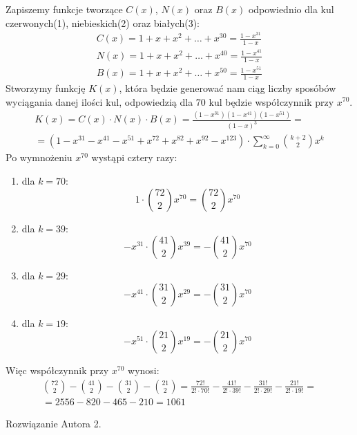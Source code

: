 \documentclass{mwart}
\begin{document}
\begin{mdframed}
    Zapiszemy funkcje tworzące $C(x)$, $N(x)$ oraz $B(x)$ odpowiednio dla kul czerwonych(1), niebieskich(2) oraz białych(3):
    \begin{align}
    C(x) = 1 + x + x^2 + \dots + x^{30} = \frac{1 - x^{31}}{1 - x} \\
    N(x) = 1 + x + x^2 + \dots + x^{40} = \frac{1 - x^{41}}{1 - x} \\
    B(x) = 1 + x + x^2 + \dots + x^{50} = \frac{1 - x^{51}}{1 - x}
    \end{align}
    Stworzymy funkcję $K(x)$, która będzie generować nam ciąg liczby sposóbów wyciągania danej ilości kul, odpowiedzią dla 70 kul będzie współczynnik przy $x^{70}$.
    \begin{gather*}
    K(x) = C(x) \cdot N(x) \cdot B(x) = \frac{(1 - x^{31})(1 - x^{41})(1 - x^{51})}{(1 - x)^3} = \\
    = (1 - x^{31} - x^{41} - x^{51} + x^{72} + x^{82} + x^{92} - x^{123}) \cdot \sum_{k=0}^{\infty} \binom{k+2}{2}x^k
    \end{gather*}
    Po wymnożeniu $x^{70}$ wystąpi cztery razy:
    \begin{enumerate}
        \item dla $k = 70$: \[ 1 \cdot \binom{72}{2}x^{70} = \binom{72}{2}x^{70}\]
        \item dla $k = 39$: \[ -x^{31} \cdot \binom{41}{2}x^{39} = -\binom{41}{2}x^{70}\]
        \item dla $k = 29$: \[ -x^{41} \cdot \binom{31}{2}x^{29} = -\binom{31}{2}x^{70}\]
        \item dla $k = 19$: \[ -x^{51} \cdot \binom{21}{2}x^{19} = -\binom{21}{2}x^{70}\]
    \end{enumerate}
    Więc współczynnik przy $x^{70}$ wynosi:
    \begin{gather*}
        \binom{72}{2} - \binom{41}{2} - \binom{31}{2} - \binom{21}{2} = \frac{72!}{2! \cdot 70!} - \frac{41!}{2! \cdot 39!} - \frac{31!}{2! \cdot 29!} - \frac{21!}{2! \cdot 19!} = \\ = 2556 - 820 - 465 - 210 = 1061
    \end{gather*}

\end{mdframed}
\begin{mdframed}
    Rozwiązanie Autora 2.
\end{mdframed}
\end{document}
